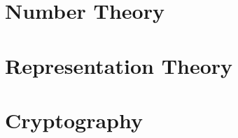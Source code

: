 

\section{Number Theory}
\label{sec:number:theory}




\bigskip



\clearpage


\section{Representation Theory}
\label{sec:representation:theory}






\bigskip
\clearpage



\section{Cryptography}
\label{sec:crypto}







\bigskip
\clearpage
